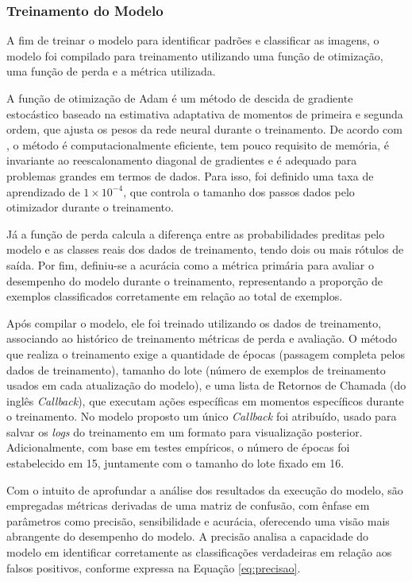 
\subsubsection{\esp Treinamento do Modelo} \label{treinamento}

A fim de treinar o modelo para identificar padrões e classificar as imagens, o modelo foi compilado para treinamento utilizando uma função de otimização, uma função de perda e a métrica utilizada. 

A função de otimização de Adam é um método de descida de gradiente estocástico baseado na estimativa adaptativa de momentos de primeira e segunda ordem, que ajusta os pesos da rede neural durante o treinamento. De acordo com , o método é computacionalmente eficiente, tem pouco requisito de memória, é invariante ao reescalonamento diagonal de gradientes e é adequado para problemas grandes em termos de dados. Para isso, foi definido uma taxa de aprendizado de \ensuremath{1 \times 10^{-4}}, que controla o tamanho dos passos dados pelo otimizador durante o treinamento.

Já a função de perda calcula a diferença entre as probabilidades preditas pelo modelo e as classes reais dos dados de treinamento, tendo dois ou mais rótulos de saída. Por fim, definiu-se a acurácia como a métrica primária para avaliar o desempenho do modelo durante o treinamento, representando a proporção de exemplos classificados corretamente em relação ao total de exemplos. 

Após compilar o modelo, ele foi treinado utilizando os dados de treinamento, associando ao histórico de treinamento métricas de perda e avaliação. O método que realiza o treinamento exige a quantidade de épocas (passagem completa pelos dados de treinamento), tamanho do lote (número de exemplos de treinamento usados em cada atualização do modelo), e uma lista de Retornos de Chamada (do inglês \textit{Callback}), que executam ações específicas em momentos específicos durante o treinamento. No modelo proposto um único \textit{Callback} foi atribuído, usado para salvar os \textit{logs} do treinamento em um formato para visualização posterior. Adicionalmente, com base em testes empíricos, o número de épocas foi estabelecido em 15, juntamente com o tamanho do lote fixado em 16.

Com o intuito de aprofundar a análise dos resultados da execução do modelo, são empregadas métricas derivadas de uma matriz de confusão, com ênfase em parâmetros como precisão, sensibilidade e acurácia, oferecendo uma visão mais abrangente do desempenho do modelo. A precisão analisa a capacidade do modelo em identificar corretamente as classificações verdadeiras em relação aos falsos positivos, conforme expressa na Equação \ref{eq:precisao}.

